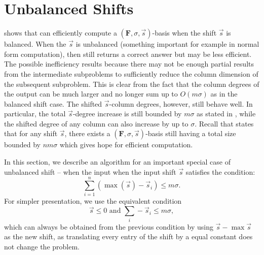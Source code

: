 
\section{Unbalanced Shifts}

\label{sec:Unbalanced-Shift}

 shows that  can efficiently
compute a $\left(\mathbf{F},\sigma,\vec{s}\right)$-basis when the
shift $\vec{s}$ is balanced. When the $\vec{s}$ is unbalanced (something
important for example in normal form computation), then 
still returns a correct answer but may be less efficient. The possible
inefficiency results because there may not be enough partial results
from the intermediate subproblems to sufficiently reduce the column
dimension of the subsequent subproblem. This is clear from the fact
that the column degrees of the output can be much larger and no longer
sum up to $O\left(m\sigma\right)$ as in the balanced shift case.
The shifted $\vec{s}$-column degrees, however, still behave well.
In particular, the total $\vec{s}$-degree increase is still bounded
by $m\sigma$ as stated in , while the shifted
degree of any column can also increase by up to $\sigma$. Recall
that  states that for any shift $\vec{s}$, there
exists a $\left(\mathbf{F},\sigma,\vec{s}\right)$-basis still having
a total size bounded by $nm\sigma$ which gives hope for efficient
computation.

In this section, we describe an algorithm for an important special
case of unbalanced shift -- when the input when the input shift $\vec{s}$
satisfies the condition:\[
\sum_{i=1}^{n}(\max(\vec{s})-\vec{s}_{i})\le m\sigma.\]
 For simpler presentation, we use the equivalent condition \begin{equation}
\vec{s}\le0\mbox{ and }\sum_{i}-\vec{s}_{i}\le m\sigma,\label{con:unbalancedCondition}\end{equation}
 which can always be obtained from the previous condition by using
$\vec{s}-\max\vec{s}$ as the new shift, as translating every entry
of the shift by a equal constant does not change the problem.

